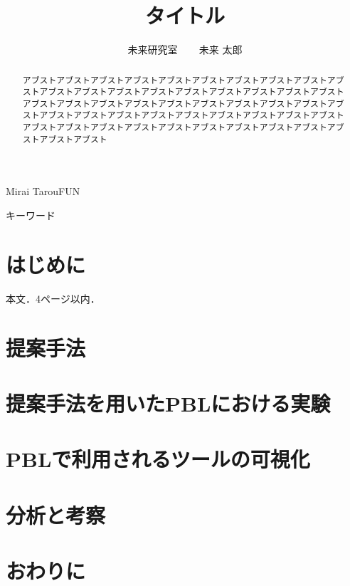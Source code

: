\documentclass[submit,techrep,noauthor]{ipsj}
\begin{document}
\title{タイトル}


\author{未来研究室 ~~~ 未来 太郎}{Mirai Tarou}{FUN}

\begin{abstract}
  アブストアブストアブストアブストアブストアブストアブストアブストアブストアブストアブストアブストアブストアブストアブストアブストアブストアブストアブストアブストアブストアブストアブストアブストアブストアブストアブストアブストアブストアブストアブストアブストアブストアブストアブストアブストアブストアブストアブストアブストアブストアブストアブストアブストアブストアブストアブストアブストアブストアブスト
\end{abstract}
%
\begin{jkeyword}
  キーワード
\end{jkeyword}
%

\maketitle
\section{はじめに}
本文\cite{sample}．4ページ以内．
\section{提案手法}

\section{提案手法を用いたPBLにおける実験}


\section{PBLで利用されるツールの可視化}


\section{分析と考察}


\section{おわりに}


\end{document}

